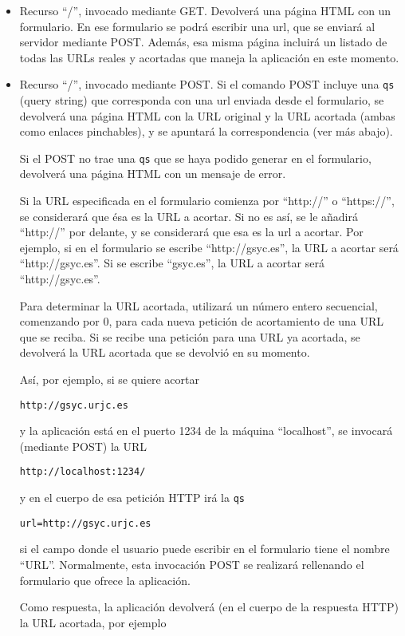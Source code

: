 \begin{itemize}
\item Recurso ``/'', invocado mediante GET. Devolverá una página HTML con un formulario. En ese formulario se podrá escribir una url, que se enviará al servidor mediante POST. Además, esa misma página incluirá un listado de todas las URLs reales y acortadas que maneja la aplicación en este momento.

\item Recurso ``/'', invocado mediante POST. Si el comando POST incluye una \texttt{qs} (query string) que corresponda con una url enviada desde el formulario, se devolverá una página HTML con la URL original y la URL acortada (ambas como enlaces pinchables), y se apuntará la correspondencia (ver más abajo).

Si el POST no trae una \texttt{qs} que se haya podido generar en el formulario, devolverá una página HTML con un mensaje de error.

Si la URL especificada en el formulario comienza por ``http://'' o ``https://'', se considerará que ésa es la URL a acortar. Si no es así, se le añadirá ``http://'' por delante, y se considerará que esa es la url a acortar. Por ejemplo, si en el formulario se escribe ``http://gsyc.es'', la URL a acortar será ``http://gsyc.es''. Si se escribe ``gsyc.es'', la URL a acortar será ``http://gsyc.es''.

Para determinar la URL acortada, utilizará un número entero secuencial, comenzando por 0, para cada nueva petición de acortamiento de una URL que se reciba. Si se recibe una petición para una URL ya acortada, se devolverá la URL acortada que se devolvió en su momento.

Así, por ejemplo, si se quiere acortar

\verb|http://gsyc.urjc.es|

y la aplicación está en el puerto 1234 de la máquina ``localhost'', se invocará (mediante POST) la URL

\verb|http://localhost:1234/|

y en el cuerpo de esa petición HTTP irá la \texttt{qs}

\verb|url=http://gsyc.urjc.es|

si el campo donde el usuario puede escribir en el formulario tiene el nombre ``URL''. Normalmente, esta invocación POST se realizará rellenando el formulario que ofrece la aplicación.

Como respuesta, la aplicación devolverá (en el cuerpo de la respuesta HTTP) la URL acortada, por ejemplo


\end{itemize}
